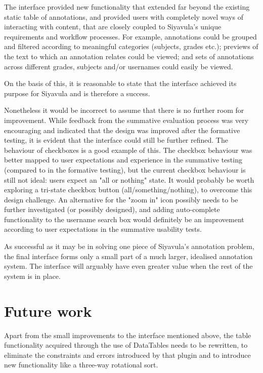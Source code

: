 The interface provided new functionality that extended far beyond the existing static table of annotations, and provided users with completely novel ways of interacting with content, that are closely coupled to Siyavula's unique requirements and workflow processes. For example, annotations could be grouped and filtered according to meaningful categories (subjects, grades etc.); previews of the text to which an annotation relates could be viewed; and sets of annotations across different grades, subjects and/or usernames could easily be viewed. 

On the basis of this, it is reasonable to state that the interface achieved its purpose for Siyavula and is therefore a success. 

Nonetheless it would be incorrect to assume that there is no further room for improvement. While feedback from the summative evaluation process was very encouraging and indicated that the design was improved after the formative testing, it is evident that the interface could still be further refined. The behaviour of checkboxes is a good example of this. The checkbox behaviour was better mapped to user expectations and experience in the summative testing (compared to in the formative testing), but the current checkbox behaviour is still not ideal: users expect an "all or nothing" state. It would probably be worth exploring a tri-state checkbox button (all/something/nothing), to overcome this design challenge. An alternative for the "zoom in" icon possibly needs to be further investigated (or possibly designed), and adding auto-complete functionality to the username search box would definitely be an improvement according to user expectations in the summative usability tests.

As successful as it may be in solving one piece of Siyavula's annotation problem, the final interface forms only a small part of a much larger, idealised annotation system. The interface will arguably have even greater value when the rest of the system is in place. 

\section{Future work}
Apart from the small improvements to the interface mentioned above, the table functionality acquired through the use of DataTables needs to be rewritten, to eliminate the constraints and errors introduced by that plugin and to introduce new functionality like a three-way rotational sort.


